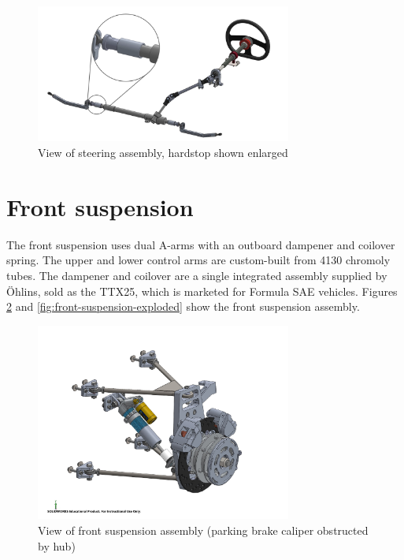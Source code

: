 \documentclass[10pt]{article}
\begin{document}
\begin{figure}[H]
\centering
\includegraphics[width=0.75\textwidth]{figures/steering-assembly}
\caption{View of steering assembly, hardstop shown enlarged}
\label{fig:steering-assembly}
\end{figure}

\section{Front suspension}
The front suspension uses dual A-arms with an outboard dampener and coilover spring. The upper and lower control arms are custom-built from 4130 chromoly tubes. The dampener and coilover are a single integrated assembly supplied by \"Ohlins, sold as the TTX25, which is marketed for Formula SAE vehicles. Figures \ref{fig:front-suspension} and \ref{fig:front-suspension-exploded} show the front suspension assembly.

\begin{figure}[H]
\centering
\includegraphics[width=0.75\textwidth]{figures/front-suspension}
\caption{View of front suspension assembly (parking brake caliper obstructed by hub)}
\label{fig:front-suspension}
\end{figure}
\end{document}
